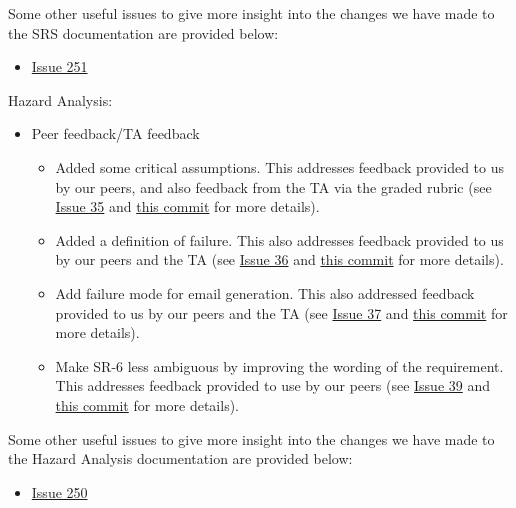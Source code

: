 \documentclass{article}
\begin{document}
Some other useful issues to give more insight into the changes we have made to the SRS documentation are provided below:

\begin{itemize}
    \item \href{https://github.com/davimang/REACH/issues/251}{Issue 251}\\
\end{itemize}

Hazard Analysis:

\begin{itemize}
    \item Peer feedback/TA feedback
    \begin{itemize}
        \item Added some critical assumptions. This addresses feedback provided to us by our peers, and also feedback from the TA via the graded rubric (see \href{https://github.com/davimang/REACH/issues/35}{Issue 35} and \href{https://github.com/davimang/REACH/commit/643f128b7c4bd9c3072f56c813d5551e18c0af4e}{this commit} for more details).
        \item Added a definition of failure. This also addresses feedback provided to us by our peers and the TA (see \href{https://github.com/davimang/REACH/issues/36}{Issue 36} and \href{https://github.com/davimang/REACH/commit/3909aa4b28693cec5cc4ef3a9d7b84c41a6ffb24}{this commit} for more details).
        \item Add failure mode for email generation. This also addressed feedback provided to us by our peers and the TA (see \href{https://github.com/davimang/REACH/issues/36}{Issue 37} and \href{https://github.com/davimang/REACH/commit/e39f11a5c2fe7af0b6e261a353f818e2780ac43d}{this commit} for more details).
        \item Make SR-6 less ambiguous by improving the wording of the requirement. This addresses feedback provided to use by our peers (see \href{https://github.com/davimang/REACH/issues/39}{Issue 39} and \href{https://github.com/davimang/REACH/commit/bb0701657d9f217275ee0027e30f728f8924e277}{this commit} for more details).
    \end{itemize}
\end{itemize}

Some other useful issues to give more insight into the changes we have made to the Hazard Analysis documentation are provided below:

\begin{itemize}
    \item \href{https://github.com/davimang/REACH/issues/250}{Issue 250}
\end{itemize}
\end{document}
